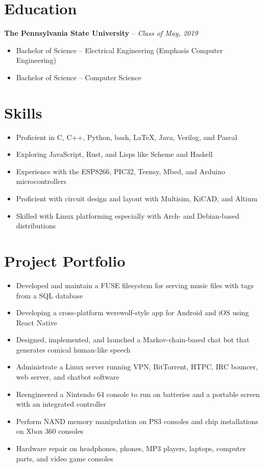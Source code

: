 \documentclass[letterpaper,10pt]{article}
\begin{document}
\section{Education}
\textbf{The Pennsylvania State University} -- \textit{Class of May, 2019}
{\setlength{\parskip}{0pt}\begin{itemize}
\item Bachelor of Science -- Electrical Engineering (Emphasis Computer Engineering)
\item Bachelor of Science -- Computer Science
\end{itemize}}

\section{Skills}
\begin{itemize}
\item Proficient in C, C++, Python, bash, \LaTeX, Java, Verilog, and Pascal
\item Exploring JavaScript, Rust, and Lisps like Scheme and Haskell
\item Experience with the ESP8266, PIC32, Teensy, Mbed, and Arduino microcontrollers
\item Proficient with circuit design and layout with Multisim, KiCAD, and Altium
\item Skilled with Linux platforming especially with Arch- and Debian-based distributions
\end{itemize}

\section{Project Portfolio}
\begin{itemize}
\item Developed and maintain a FUSE filesystem for serving music files with tags from a SQL database
\item Developing a cross-platform werewolf-style app for Android and iOS using React Native
\item Designed, implemented, and launched a Markov-chain-based chat bot that generates comical human-like speech
\item Administrate a Linux server running VPN, BitTorrent, HTPC, IRC bouncer, web server, and chatbot software
\item Reengineered a Nintendo 64 console to run on batteries and a portable screen with an integrated controller
\item Perform NAND memory manipulation on PS3 consoles and chip installations on Xbox 360 consoles
\item Hardware repair on headphones, phones, MP3 players, laptops, computer parts, and video game consoles
\end{itemize}
\end{document}

